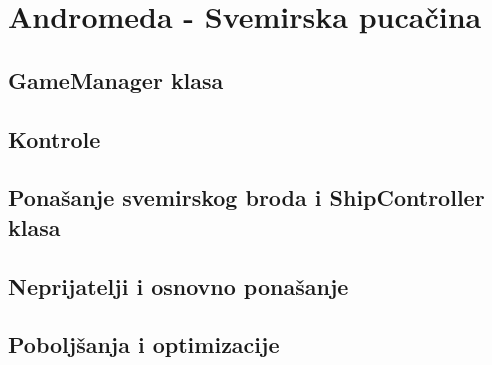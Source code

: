 \clearpage
\section{Andromeda - Svemirska puca\v{c}ina}
\label{sec:Section_Name_X}

\subsection{GameManager klasa}

\subsection{Kontrole}

\subsection{Pona\v{s}anje svemirskog broda i ShipController klasa}

\subsection{Neprijatelji i osnovno pona\v{s}anje}

\subsection{Pobolj\v{s}anja i optimizacije}
